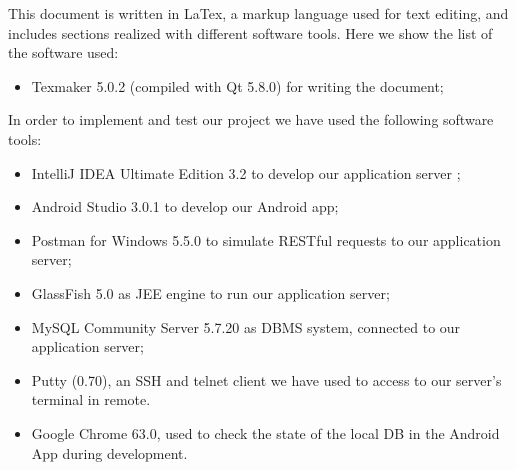 This document is written in LaTex, a markup language used for text editing, and includes sections realized with different software tools. Here we show the list of the software used:
\begin{itemize}
	\item Texmaker 5.0.2 (compiled with Qt 5.8.0) for writing the document;
\end{itemize}
In order to implement and test our project we have used the following software tools:
\begin{itemize}
	\item IntelliJ IDEA Ultimate Edition 3.2 to develop our application server ;
	\item Android Studio 3.0.1 to develop our Android app;
	\item Postman for Windows 5.5.0 to simulate RESTful requests to our application server;
	\item GlassFish 5.0 as JEE engine to run our application server;
	\item MySQL Community Server 5.7.20 as DBMS system, connected to our application server;
	\item Putty (0.70), an SSH and telnet client we have used to access to our server's terminal in remote.
	\item Google Chrome 63.0, used to check the state of the local DB in the Android App during development.
\end{itemize}